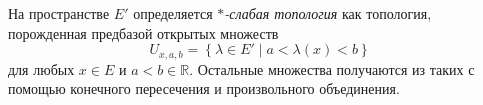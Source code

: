 


\begin{to_def}
    На пространстве $E'$ определяется \textit{$*$-слабая топология} как топология, порожденная предбазой открытых множеств
    \begin{equation*}
        U_{x, a, b} = \left\{
            \lambda \in E' \mid a < \lambda(x) < b
        \right\}
    \end{equation*}
    для любых $x \in E$ и $a < b \in \mathbb{R}$. Остальные множества получаются из таких с помощью конечного пересечения и произвольного объединения. 
\end{to_def}


